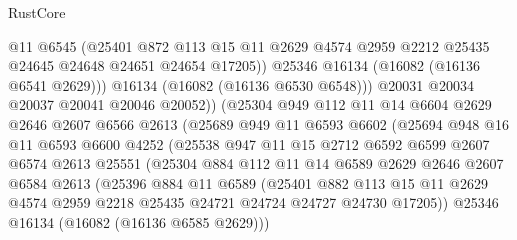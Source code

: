 \begin{lexlean}{RustCore}
\begin{coremodule}
                      @11
                      @6545
                      (@25401
                        @872
                        @113
                        @15
                        @11
                        @2629
                        @4574
                        @2959
                        @2212
                        @25435
                        @24645
                        @24648
                        @24651
                        @24654
                        @17205))
                    @25346
                    @16134
                    (@16082 (@16136 @6541 @2629)))
                  @16134
                  (@16082 (@16136 @6530 @6548)))
                @20031
                @20034
                @20037
                @20041
                @20046
                @20052))
            (@25304
              @949
              @112
              @11
              @14
              @6604
              @2629
              @2646
              @2607
              @6566
              @2613
              (@25689
                @949
                @11
                @6593
                @6602
                (@25694
                  @948
                  @16
                  @11
                  @6593
                  @6600
                  @4252
                  (@25538
                    @947
                    @11
                    @15
                    @2712
                    @6592
                    @6599
                    @2607
                    @6574
                    @2613
                    @25551
                    (@25304
                      @884
                      @112
                      @11
                      @14
                      @6589
                      @2629
                      @2646
                      @2607
                      @6584
                      @2613
                      (@25396
                        @884
                        @11
                        @6589
                        (@25401
                          @882
                          @113
                          @15
                          @11
                          @2629
                          @4574
                          @2959
                          @2218
                          @25435
                          @24721
                          @24724
                          @24727
                          @24730
                          @17205))
                      @25346
                      @16134
                      (@16082 (@16136 @6585 @2629)))

\end{coremodule}
\end{lexlean}
